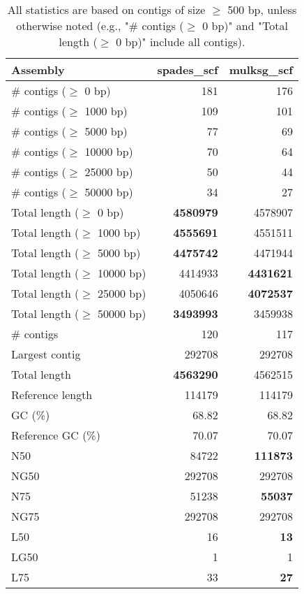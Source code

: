 \documentclass[12pt,a4paper]{article}
\begin{document}
\begin{table}[ht]
\begin{center}
\caption{All statistics are based on contigs of size $\geq$ 500 bp, unless otherwise noted (e.g., "\# contigs ($\geq$ 0 bp)" and "Total length ($\geq$ 0 bp)" include all contigs).}
\begin{tabular}{|l*{2}{|r}|}
\hline
Assembly & spades\_scf & mulksg\_scf \\ \hline
\# contigs ($\geq$ 0 bp) & 181 & 176 \\ \hline
\# contigs ($\geq$ 1000 bp) & 109 & 101 \\ \hline
\# contigs ($\geq$ 5000 bp) & 77 & 69 \\ \hline
\# contigs ($\geq$ 10000 bp) & 70 & 64 \\ \hline
\# contigs ($\geq$ 25000 bp) & 50 & 44 \\ \hline
\# contigs ($\geq$ 50000 bp) & 34 & 27 \\ \hline
Total length ($\geq$ 0 bp) & {\bf 4580979} & 4578907 \\ \hline
Total length ($\geq$ 1000 bp) & {\bf 4555691} & 4551511 \\ \hline
Total length ($\geq$ 5000 bp) & {\bf 4475742} & 4471944 \\ \hline
Total length ($\geq$ 10000 bp) & 4414933 & {\bf 4431621} \\ \hline
Total length ($\geq$ 25000 bp) & 4050646 & {\bf 4072537} \\ \hline
Total length ($\geq$ 50000 bp) & {\bf 3493993} & 3459938 \\ \hline
\# contigs & 120 & 117 \\ \hline
Largest contig & 292708 & 292708 \\ \hline
Total length & {\bf 4563290} & 4562515 \\ \hline
Reference length & 114179 & 114179 \\ \hline
GC (\%) & 68.82 & 68.82 \\ \hline
Reference GC (\%) & 70.07 & 70.07 \\ \hline
N50 & 84722 & {\bf 111873} \\ \hline
NG50 & 292708 & 292708 \\ \hline
N75 & 51238 & {\bf 55037} \\ \hline
NG75 & 292708 & 292708 \\ \hline
L50 & 16 & {\bf 13} \\ \hline
LG50 & 1 & 1 \\ \hline
L75 & 33 & {\bf 27} \\ \hline

\end{tabular}
\end{center}
\end{table}
\end{document}
